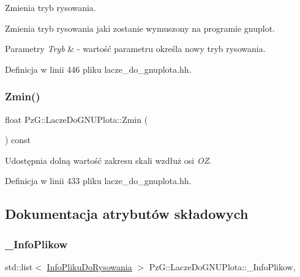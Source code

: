Zmienia tryb rysowania. 

Zmienia tryb rysowania jaki zostanie wymuszony na programie {\ttfamily gnuplot}. 
\begin{DoxyParams}{Parametry}
{\em Tryb} & -\/ wartość parametru określa nowy tryb rysowania. \\
\hline
\end{DoxyParams}


Definicja w linii 446 pliku lacze\+\_\+do\+\_\+gnuplota.\+hh.

\mbox{\label{class_pz_g_1_1_lacze_do_g_n_u_plota_a9068bd9a9873ba9c6d70016f1ae7cd7f}} 
\subsubsection{\texorpdfstring{Zmin()}{Zmin()}}
{\footnotesize\ttfamily float Pz\+G\+::\+Lacze\+Do\+G\+N\+U\+Plota\+::\+Zmin (\begin{DoxyParamCaption}{ }\end{DoxyParamCaption}) const\hspace{0.3cm}{\ttfamily [inline]}}

Udostępnia dolną wartość zakresu skali wzdłuż osi {\itshape OZ}. 

Definicja w linii 433 pliku lacze\+\_\+do\+\_\+gnuplota.\+hh.



\subsection{Dokumentacja atrybutów składowych}
\mbox{\label{class_pz_g_1_1_lacze_do_g_n_u_plota_a1916c5a6fecfb3554e9d5204b2f2086c}} 
\subsubsection{\texorpdfstring{\+\_\+\+Info\+Plikow}{\_InfoPlikow}}
{\footnotesize\ttfamily std\+::list$<$ \hyperlink{class_pz_g_1_1_info_pliku_do_rysowania}{Info\+Pliku\+Do\+Rysowania} $>$ Pz\+G\+::\+Lacze\+Do\+G\+N\+U\+Plota\+::\+\_\+\+Info\+Plikow\hspace{0.3cm}{\ttfamily [static]}, {\ttfamily [protected]}}



